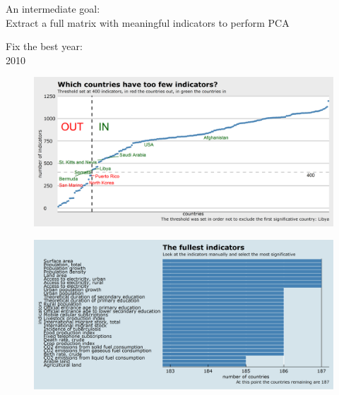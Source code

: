 \documentclass[10pt]{beamer}
\begin{document}
\begin{frame}
	\begin{center}
		{\Large An intermediate goal:} \\[.2cm]
		Extract a full matrix with meaningful indicators to perform PCA
	\end{center}
\end{frame}

\begin{frame}
	\begin{center}
		{\Large Fix the best year: \\[.3cm]
		2010}
	\end{center}
\end{frame}

\begin{frame}
	\begin{figure}
		\centering
		\includegraphics[width=\textwidth]{plot0005.png}
	\end{figure}
\end{frame}

\begin{frame}
	\begin{figure}
		\centering
		\includegraphics[width=\textwidth]{plot0006.png}
	\end{figure}
\end{frame}
\end{document}
